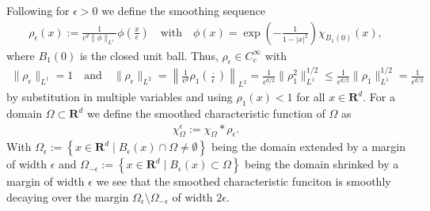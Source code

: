 \documentclass[a4paper]{article}
\newcommand{\rr}[1]{\mathbf{R}^{#1}}
\newcommand{\conv}[0]{*}
\numberwithin{equation}{section}
\theoremstyle{remark}
\begin{document}
Following \cite[Lemma 2.4 and Definition 3.1]{Tartar07IntroductionSobolevSpaces} 
for $\epsilon > 0$ we define the smoothing sequence
\begin{align*}
    \rho_\epsilon(x):=
    \frac{1}{\epsilon^d\|\phi\|_{L^1}}\phi
    \left(\frac{x}{\epsilon}\right)\quad
    \text{with}
    \quad\phi(x)=\exp\left(-\frac{1}{1-|x|^2}\right)\chi_{B_1(0)}(x),
\end{align*}
where $B_1(0)$ is the closed unit ball.
Thus, \(\rho_\epsilon\in C_c^\infty\) with 
\begin{align}
\label{eq:mollifier_norms}
    \|\rho_\epsilon\|_{L^1}=1
    \quad\text{and}\quad
    \|\rho_\epsilon\|_{L^2}
    =\left\|\frac{1}{\epsilon^d}\rho_1
    \left(\frac{\cdot}{\epsilon}\right)\right\|_{L^2}
    =\frac{1}{\epsilon^{d/2}}\|\rho_1^2\|_{L^1}^{1/2}
    \leq\frac{1}{\epsilon^{d/2}}\|\rho_1\|_{L^1}^{1/2}
    =\frac{1}{\epsilon^{d/2}}
\end{align}
by substitution in multiple variables and using \(\rho_1(x)<1\) for all \(x\in\rr{d}\).
For a domain $\Omega\subset \rr{d}$ we define the smoothed characteristic function of \(\Omega\) as
\begin{align*}
    \chi_{\Omega}^\epsilon:=\chi_{\Omega} \conv \rho_{\epsilon}.
\end{align*}
With \(\Omega_\epsilon := \left\{x\in \rr{d}\mid B_\epsilon(x)\cap\Omega\neq\emptyset\right\}\)
being the domain extended by a margin of width $\epsilon$
and
\(\Omega_{-\epsilon}:= \left\{x\in \rr{d} \mid B_\epsilon(x)\subset\Omega\right\}\)
being the domain shrinked by a margin of width $\epsilon$
we see that the smoothed characteristic funciton is smoothly decaying over the margin
\(\Omega_{\epsilon}\setminus \Omega_{-\epsilon}\)
of width \(2\epsilon\).
\end{document}
